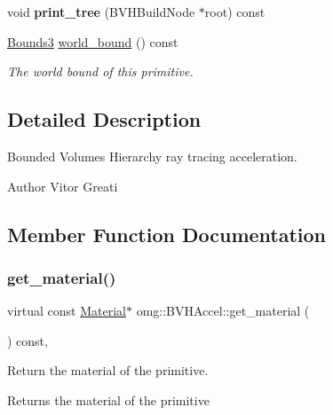 \begin{DoxyCompactItemize}
\mbox{\label{classomg_1_1_b_v_h_accel_ad124bae28521ee2aa4324177f2a03e8f}} 
void {\bfseries print\+\_\+tree} (B\+V\+H\+Build\+Node $\ast$root) const
\item 
\mbox{\hyperlink{classomg_1_1_bounds3}{Bounds3}} \mbox{\hyperlink{classomg_1_1_b_v_h_accel_a8de5010cc4ddf9e0673461d711b9930b}{world\+\_\+bound}} () const
\begin{DoxyCompactList}\small\item\em The world bound of this primitive. \end{DoxyCompactList}\end{DoxyCompactItemize}


\subsection{Detailed Description}
Bounded Volumes Hierarchy ray tracing acceleration. 

\begin{DoxyAuthor}{Author}
Vitor Greati 
\end{DoxyAuthor}


\subsection{Member Function Documentation}
\mbox{\label{classomg_1_1_b_v_h_accel_afc47144553f2de1a23c4053e56747eee}} 
\subsubsection{\texorpdfstring{get\_material()}{get\_material()}}
{\footnotesize\ttfamily virtual const \mbox{\hyperlink{classomg_1_1_material}{Material}}$\ast$ omg\+::\+B\+V\+H\+Accel\+::get\+\_\+material (\begin{DoxyParamCaption}{ }\end{DoxyParamCaption}) const\hspace{0.3cm}{\ttfamily [inline]}, {\ttfamily [virtual]}}



Return the material of the primitive. 

\begin{DoxyReturn}{Returns}
the material of the primitive 
\end{DoxyReturn}


